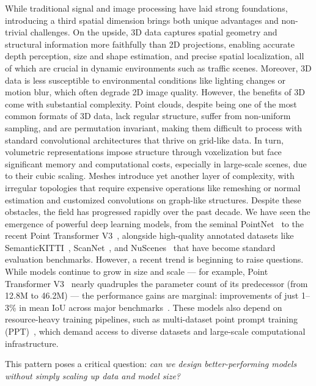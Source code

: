 While traditional signal and image processing have laid strong foundations,
introducing a third spatial dimension brings both unique advantages and
non-trivial challenges. On the upside, 3D data captures spatial geometry and
structural information more faithfully than 2D projections, enabling accurate
depth perception, size and shape estimation, and precise spatial localization,
all of which are crucial in dynamic environments such as traffic scenes.
%
Moreover, 3D data is less susceptible to environmental conditions like lighting
changes or motion blur, which often degrade 2D image quality.
%
However, the benefits of 3D come with substantial complexity. Point clouds,
despite being one of the most common formats of 3D data, lack regular structure, suffer
from non-uniform sampling, and are permutation invariant, making them difficult
to process with standard convolutional architectures that thrive on grid-like
data. In turn, volumetric representations impose structure through voxelization
but face significant memory and computational costs, especially in large-scale
scenes, due to their cubic scaling.
%
Meshes introduce yet another layer of complexity, with irregular topologies
that require expensive operations like remeshing or normal estimation and
customized convolutions on graph-like structures.
%
Despite these obstacles, the field has progressed rapidly over the past decade.
We have seen the emergence of powerful deep learning models, from the seminal
PointNet~\cite{qi2017pointnet} to the recent Point Transformer
V3~\cite{wu2023ptv3}, alongside high-quality annotated datasets like
SemanticKITTI~\cite{behley2019semantickitti}, ScanNet~\cite{dai2017scannet},
and NuScenes~\cite{caesar2020nuscenes} that have become standard evaluation
benchmarks.
%
However, a recent trend is beginning to raise questions. While models continue
to grow in size and scale --- for example, Point Transformer
V3~\cite{wu2023ptv3} nearly quadruples the parameter count of its predecessor
(from 12.8M to 46.2M) --- the performance gains are marginal: improvements of
just 1–3\% in mean IoU across major
benchmarks~\cite{behley2019semantickitti,dai2017scannet,caesar2020nuscenes}.
These models also depend on resource-heavy training pipelines, such as
multi-dataset point prompt training (PPT)~\cite{wu2024towards}, which demand
access to diverse datasets and large-scale computational infrastructure.

This pattern poses a critical question: \textit{can we design better-performing
      models without simply scaling up data and model size?}

